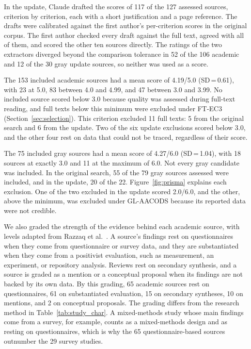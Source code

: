 \documentclass[preprint,number]{elsarticle}
\newcounter{study}
\begin{document}
In the update, Claude drafted the scores of 117 of the 127 assessed sources, criterion by criterion, each with a short justification and a page reference. The drafts were calibrated against the first author's per-criterion scores in the original corpus. The first author checked every draft against the full text, agreed with all of them, and scored the other ten sources directly. The ratings of the two extractors diverged beyond the comparison tolerance in 52 of the 106 academic and 12 of the 30 gray update sources, so neither was used as a score.

The 153 included academic sources had a mean score of 4.19/5.0 (SD\,=\,0.61), with 23 at 5.0, 83 between 4.0 and 4.99, and 47 between 3.0 and 3.99. No included source scored below 3.0 because quality was assessed during full-text reading, and full texts below this minimum were excluded under FT-EC3 (Section~\ref{sec:selection}). This criterion excluded 11 full texts: 5 from the original search and 6 from the update. Two of the six update exclusions scored below 3.0, and the other four rest on data that could not be traced, regardless of their score.

The 75 included gray sources had a mean score of 4.27/6.0 (SD\,=\,1.04), with 18 sources at exactly 3.0 and 11 at the maximum of 6.0. Not every gray candidate was included. In the original search, 55 of the 79 gray sources assessed were included, and in the update, 20 of the 22. Figure~\ref{fig:prisma} explains each exclusion. One of the two excluded in the update scored 2.0/6.0, and the other, above the minimum, was excluded under GL-AACODS because its reported data were not credible.

We also graded the strength of the evidence behind each academic source, with levels adapted from Razzaq et al.~\cite{P0604}. A source's findings rest on questionnaires when they come from questionnaire or survey data, and they are substantiated when they come from a positivist evaluation, such as measurement, an experiment, or repository analysis. Reviews rest on secondary synthesis, and a source is graded as a mention or a conceptual proposal when its findings are not backed by its own data. By this grading, 65 academic sources rest on questionnaires, 61 on substantiated evaluation, 15 on secondary syntheses, 10 on mentions, and 2 on conceptual proposals. The grading differs from the research method in Table~\ref{tab:study_char}. A mixed-methods study whose main findings come from a survey, for example, counts as a mixed-methods design and as resting on questionnaires, which is why the 65 questionnaire-based sources outnumber the 29 survey studies.
\end{document}
